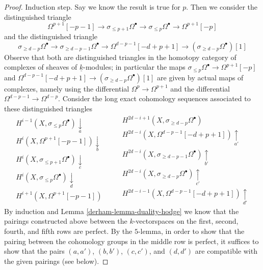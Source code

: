 \begin{proof}
\medskip\noindent
Induction step. Say we know the result is true for $p$. Then
we consider the distinguished triangle
$$
\Omega^{p + 1}[-p - 1] \to
\sigma_{\leq p + 1}\Omega^\bullet \to
\sigma_{\leq p}\Omega^\bullet \to
\Omega^{p + 1}[-p]
$$
and the distinguished triangle
$$
\sigma_{\geq d - p}\Omega^\bullet \to
\sigma_{\geq d - p - 1}\Omega^\bullet \to
\Omega^{d - p - 1}[-d + p + 1] \to
(\sigma_{\geq d - p}\Omega^\bullet)[1]
$$
Observe that both are distinguished triangles in the homotopy category
of complexes of sheaves of $\underline{k}$-modules; in particular the
maps $\sigma_{\leq p}\Omega^\bullet \to \Omega^{p + 1}[-p]$ and
$\Omega^{d - p - 1}[-d + p + 1] \to (\sigma_{\geq d - p}\Omega^\bullet)[1]$
are given by actual maps of complexes, namely using the differential
$\Omega^p \to \Omega^{p + 1}$ and the differential
$\Omega^{d - p - 1} \to \Omega^{d - p}$.
Consider the long exact cohomology sequences associated to these
distinguished triangles
$$
\begin{array}{c}H^{i - 1}(X, \sigma_{\leq p}\Omega^\bullet) \underset{a}{\downarrow} \\ H^i(X, \Omega^{p + 1}[-p - 1]) \underset{b}{\downarrow} \\ H^i(X, \sigma_{\leq p + 1}\Omega^\bullet) \underset{c}{\downarrow} \\ H^i(X, \sigma_{\leq p}\Omega^\bullet) \underset{d}{\downarrow} \\ H^{i + 1}(X, \Omega^{p + 1}[-p - 1])\end{array}
\quad\quad
\begin{array}{c}H^{2d - i  + 1}(X, \sigma_{\geq d - p}\Omega^\bullet) \\ H^{2d - i}(X, \Omega^{d - p - 1}[-d + p + 1]) \underset{a'}{\uparrow} \\ H^{2d - i}(X, \sigma_{\geq d - p - 1}\Omega^\bullet) \underset{b'}{\uparrow} \\ H^{2d - i}(X, \sigma_{\geq d - p}\Omega^\bullet) \underset{c'}{\uparrow} \\ H^{2d - i - 1}(X, \Omega^{d - p - 1}[-d + p + 1]) \underset{d'}{\uparrow}\end{array}
$$
By induction and Lemma \ref{derham-lemma-duality-hodge}
we know that the pairings constructed above between the
$k$-vectorspaces on the first, second, fourth, and fifth
rows are perfect. By the $5$-lemma, in order to show that
the pairing between the cohomology groups in the middle row
is perfect, it suffices to show that the pairs
$(a, a')$, $(b, b')$, $(c, c')$, and $(d, d')$
are compatible with the given pairings (see below).


\end{proof}
